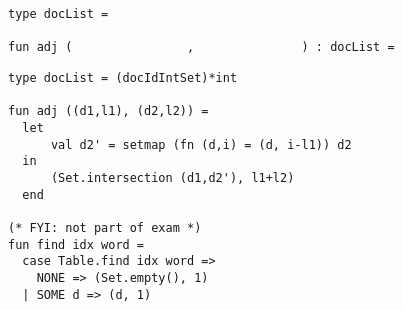 \begin{mproblem}
\begin{problem}
\begin{lstlisting}[numbers=none]
type docList = 

fun adj (                ,               ) : docList =
\end{lstlisting}


\sol \label{\sol:practice-exam-ii::type}

\begin{lstlisting}[numbers=none]
type docList = (docIdIntSet)*int

fun adj ((d1,l1), (d2,l2)) = 
  let 
      val d2' = setmap (fn (d,i) = (d, i-l1)) d2
  in  
      (Set.intersection (d1,d2'), l1+l2)
  end

(* FYI: not part of exam *)
fun find idx word = 
  case Table.find idx word =>
    NONE => (Set.empty(), 1)
  | SOME d => (d, 1)
\end{lstlisting}

\end{problem}
\end{mproblem}

